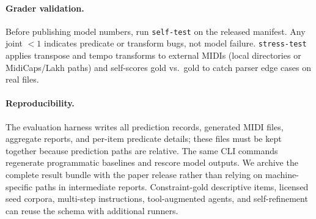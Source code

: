 \paragraph{Grader validation.}
Before publishing model numbers, run \texttt{self-test} on the released manifest. Any joint $< 1$ indicates predicate or transform bugs, not model failure. \texttt{stress-test} applies transpose and tempo transforms to external MIDIs (local directories or MidiCaps/Lakh paths) and self-scores gold vs.\ gold to catch parser edge cases on real files.

\paragraph{Reproducibility.}
The evaluation harness writes all prediction records, generated MIDI files, aggregate reports, and per-item predicate details; these files must be kept together because prediction paths are relative. The same CLI commands regenerate programmatic baselines and rescore model outputs. We archive the complete result bundle with the paper release rather than relying on machine-specific paths in intermediate reports. Constraint-gold descriptive items, licensed seed corpora, multi-step instructions, tool-augmented agents, and self-refinement can reuse the schema with additional runners.
